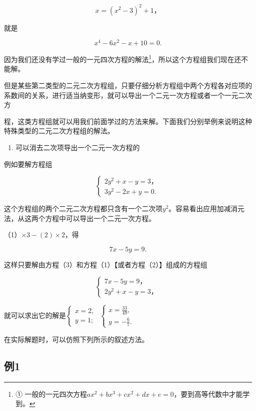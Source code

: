 \[
x = (x ^ {2} - 3) ^ {2} + 1\text{，}
\]

就是

\[
x ^ {4} - 6 x ^ {2} - x + 10 = 0. \tag{3}
\]

因为我们还没有学过一般的一元四次方程的解法\footnote{①
  一般的一元四次方程\(ax^2 + bx^3 + cx^2 + dx + e = 0\)，要到高等代数中才能学到。}，所以这个方程组我们现在还不能解。

但是某些第二类型的二元二次方程组，只要仔细分析方程组中两个方程各对应项的系数间的关系，进行适当纳变形，就可以导出一个二元一次方程或者一个一元二次方

程，这类方程组就可以用我们前面学过的方法来解。下面我们分别举例来说明这种特殊类型的二元二次方程组的解法。

\begin{enumerate}
\item
  可以消去二次项导出一个二元一次方程的
\end{enumerate}

例如要解方程组

\[
\left\{ \begin{array}{l} 2 y ^ {2} + x - y = 3\text{，} \\ 3 y ^ {2} - 2 x + y = 0. \end{array} \right. \tag{1}
\]

这个方程组的两个二元二次方程都只含有一个二次项\(y^{2}\)。容易看出应用加减消元法，从这两个方程中可以导出一个二元一次方程。

（1）\(\times 3 - (2) \times 2\)，得

\[
7 x - 5 y = 9. \tag{3}
\]

这样只要解由方程（3）和方程（1）【或者方程（2）】组成的方程组

\[
\left\{ \begin{array}{l} 7 x - 5 y = 9\text{，} \\ 2 y ^ {2} + x - y = 3\text{，} \end{array} \right.
\]

就可以求出它的解是\(\left\{ \begin{array}{l} x = 2, \\ y = 1; \end{array} \right.\) \(\left\{ \begin{array}{l} x = \frac{33}{49}, \\ y = -\frac{6}{7}. \end{array} \right.\)

在实际解题时，可以仿照下列所示的叙述方法。

\subsection{例1}

